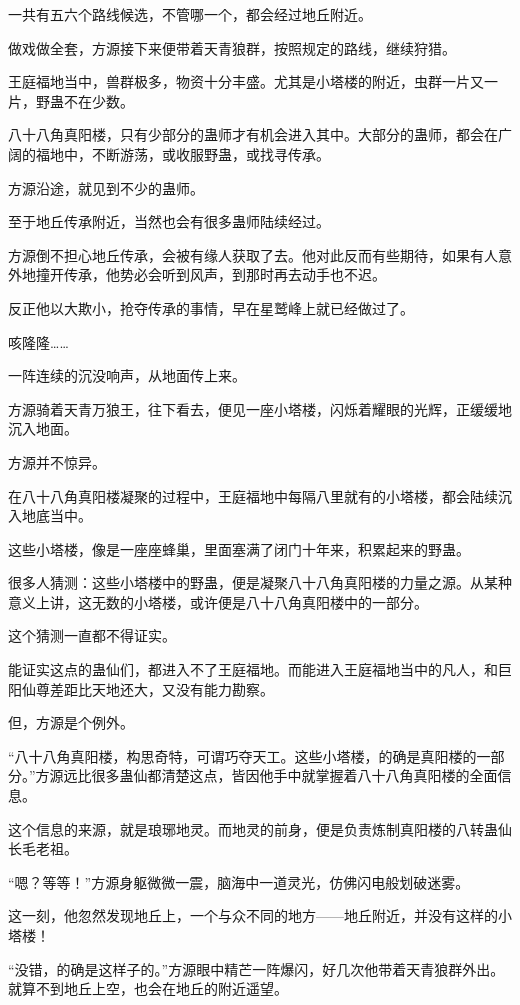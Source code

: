 \begin{this_body}
一共有五六个路线候选，不管哪一个，都会经过地丘附近。

做戏做全套，方源接下来便带着天青狼群，按照规定的路线，继续狩猎。

王庭福地当中，兽群极多，物资十分丰盛。尤其是小塔楼的附近，虫群一片又一片，野蛊不在少数。

八十八角真阳楼，只有少部分的蛊师才有机会进入其中。大部分的蛊师，都会在广阔的福地中，不断游荡，或收服野蛊，或找寻传承。

方源沿途，就见到不少的蛊师。

至于地丘传承附近，当然也会有很多蛊师陆续经过。

方源倒不担心地丘传承，会被有缘人获取了去。他对此反而有些期待，如果有人意外地撞开传承，他势必会听到风声，到那时再去动手也不迟。

反正他以大欺小，抢夺传承的事情，早在星鹫峰上就已经做过了。

咳隆隆……

一阵连续的沉没响声，从地面传上来。

方源骑着天青万狼王，往下看去，便见一座小塔楼，闪烁着耀眼的光辉，正缓缓地沉入地面。

方源并不惊异。

在八十八角真阳楼凝聚的过程中，王庭福地中每隔八里就有的小塔楼，都会陆续沉入地底当中。

这些小塔楼，像是一座座蜂巢，里面塞满了闭门十年来，积累起来的野蛊。

很多人猜测：这些小塔楼中的野蛊，便是凝聚八十八角真阳楼的力量之源。从某种意义上讲，这无数的小塔楼，或许便是八十八角真阳楼中的一部分。

这个猜测一直都不得证实。

能证实这点的蛊仙们，都进入不了王庭福地。而能进入王庭福地当中的凡人，和巨阳仙尊差距比天地还大，又没有能力勘察。

但，方源是个例外。

“八十八角真阳楼，构思奇特，可谓巧夺天工。这些小塔楼，的确是真阳楼的一部分。”方源远比很多蛊仙都清楚这点，皆因他手中就掌握着八十八角真阳楼的全面信息。

这个信息的来源，就是琅琊地灵。而地灵的前身，便是负责炼制真阳楼的八转蛊仙长毛老祖。

“嗯？等等！”方源身躯微微一震，脑海中一道灵光，仿佛闪电般划破迷雾。

这一刻，他忽然发现地丘上，一个与众不同的地方——地丘附近，并没有这样的小塔楼！

“没错，的确是这样子的。”方源眼中精芒一阵爆闪，好几次他带着天青狼群外出。就算不到地丘上空，也会在地丘的附近遥望。


\end{this_body}
